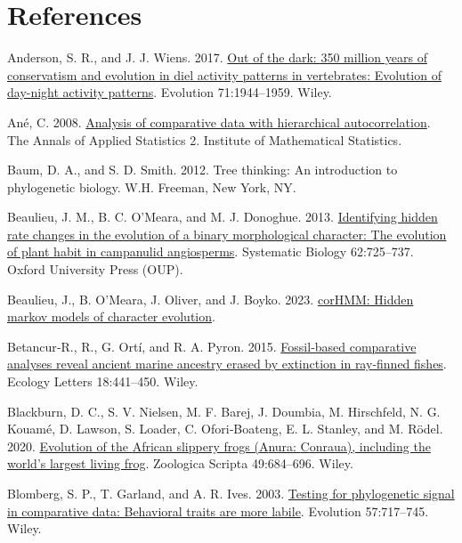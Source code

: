 \documentclass{article}
\newlength{\cslhangindent}
\newenvironment{CSLReferences}[2] %
 {\begin{list}{}{%
  \setlength{\itemindent}{0pt}
  \setlength{\leftmargin}{0pt}
  \setlength{\parsep}{0pt}
  \ifodd #1
   \setlength{\leftmargin}{\cslhangindent}
   \setlength{\itemindent}{-1\cslhangindent}
  \fi
  \setlength{\itemsep}{#2\baselineskip}}}
 {\end{list}}
\begin{document}
\section*{References}\label{references}

\label{refs}
\begin{CSLReferences}{1}{0}
Anderson, S. R., and J. J. Wiens. 2017. \href{https://doi.org/10.1111/evo.13284}{Out of the dark: 350 million years of conservatism and evolution in diel activity patterns in vertebrates: Evolution of day-night activity patterns}. Evolution 71:1944--1959. Wiley.

Ané, C. 2008. \href{https://doi.org/10.1214/08-aoas173}{Analysis of comparative data with hierarchical autocorrelation}. The Annals of Applied Statistics 2. Institute of Mathematical Statistics.

Baum, D. A., and S. D. Smith. 2012. Tree thinking: An introduction to phylogenetic biology. W.H. Freeman, New York, NY.

Beaulieu, J. M., B. C. O'Meara, and M. J. Donoghue. 2013. \href{https://doi.org/10.1093/sysbio/syt034}{Identifying hidden rate changes in the evolution of a binary morphological character: The evolution of plant habit in campanulid angiosperms}. Systematic Biology 62:725--737. Oxford University Press (OUP).

Beaulieu, J., B. O'Meara, J. Oliver, and J. Boyko. 2023. \href{https://github.com/thej022214/corHMM}{corHMM: Hidden markov models of character evolution}.

Betancur‐R., R., G. Ortí, and R. A. Pyron. 2015. \href{https://doi.org/10.1111/ele.12423}{Fossil‐based comparative analyses reveal ancient marine ancestry erased by extinction in ray‐finned fishes}. Ecology Letters 18:441--450. Wiley.

Blackburn, D. C., S. V. Nielsen, M. F. Barej, J. Doumbia, M. Hirschfeld, N. G. Kouamé, D. Lawson, S. Loader, C. Ofori‐Boateng, E. L. Stanley, and M. Rödel. 2020. \href{https://doi.org/10.1111/zsc.12447}{Evolution of the {A}frican slippery frogs ({A}nura: {C}onraua), including the world's largest living frog}. Zoologica Scripta 49:684--696. Wiley.

Blomberg, S. P., T. Garland, and A. R. Ives. 2003. \href{https://doi.org/10.1111/j.0014-3820.2003.tb00285.x}{Testing for phylogenetic signal in comparative data: Behavioral traits are more labile}. Evolution 57:717--745. Wiley.


\end{CSLReferences}
\end{document}
